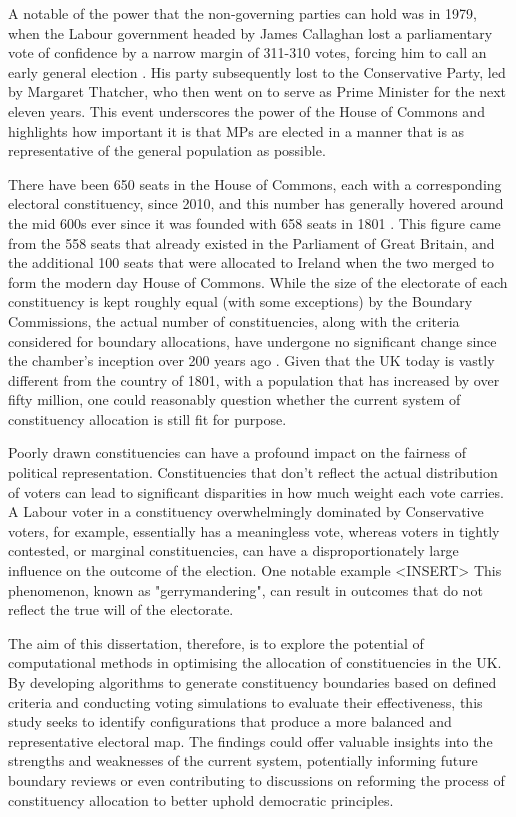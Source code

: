 \documentclass{article}
\begin{document}
A notable of the power that the non-governing parties can hold was in 1979, when the Labour government headed by James Callaghan lost a parliamentary vote of confidence
by a narrow margin of 311-310 votes, forcing him to call an early general election \cite{callaghan}. His party subsequently lost to the Conservative Party, led by Margaret Thatcher, who then went on to
serve as Prime Minister for the next eleven years. This event underscores the power of the House of Commons and highlights how important it is that MPs are elected in a manner
that is as representative of the general population as possible.

There have been 650 seats in the House of Commons, each with a corresponding electoral constituency, since 2010, and this number has generally hovered around the mid 600s ever
since it was founded with 658 seats in 1801 \cite{numofseats}. This figure came from the 558 seats that already existed in the Parliament 
of Great Britain, and the additional 100 seats that were allocated to Ireland when the two merged to form the modern day House of Commons. 
While the size of the electorate of each constituency is kept roughly equal  (with some exceptions) by the Boundary Commissions, the actual number of constituencies, along
with the criteria considered for boundary allocations, have undergone no significant change since the chamber's inception over 200 years ago \cite{parlcons}.
Given that the UK today is vastly different from the country of 1801, with a population that has increased by over fifty million, one could reasonably question
whether the current system of constituency allocation is still fit for purpose.

Poorly drawn constituencies can have a profound impact on the fairness of political representation. Constituencies that don't reflect the actual distribution of voters can lead to 
significant disparities in how much weight each vote carries. A Labour voter in a constituency overwhelmingly dominated by Conservative voters, for example, essentially has a meaningless
vote, whereas voters in tightly contested, or marginal constituencies, can have a disproportionately large influence on the outcome of the election. One notable example <INSERT>
This phenomenon, known as "gerrymandering", can result in outcomes that do not reflect the true will of the electorate.

The aim of this dissertation, therefore, is to explore the potential of computational methods in optimising the allocation of constituencies in the UK. 
By developing algorithms to generate constituency boundaries based on defined criteria and conducting voting simulations to evaluate their effectiveness, 
this study seeks to identify configurations that produce a more balanced and representative electoral map. The findings could offer valuable insights into the strengths 
and weaknesses of the current system, potentially informing future boundary reviews or even contributing to discussions on reforming the process of constituency allocation 
to better uphold democratic principles.
\end{document}
